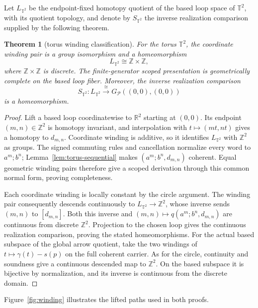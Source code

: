 \documentclass[10pt,reqno]{amsart}
\theoremstyle{definition}
\theoremstyle{plain}
\newtheorem{theorem}[definition]{Theorem}
\theoremstyle{remark}
\newcommand{\Z}{\mathbb Z}
\newcommand{\FigureAltText}[1]{\par\smallskip{\small\textbf{Alt text:} #1\par}}
\newcommand{\MainFigure}[2]{%
  \begingroup\let\SavedFigureCaption\caption
  \renewcommand{\caption}[1]{\SavedFigureCaption{##1}\FigureAltText{#2}}%
  \endgroup}
\begin{document}
Let $L_{\mathbb T^2}$ be the endpoint-fixed homotopy quotient of the based
loop space of $\mathbb T^2$, with its quotient topology, and denote by
$S_{\mathbb T^2}$ the inverse realization comparison supplied by the
following theorem.

\begin{theorem}[torus winding classification]
\label{thm:torus-winding}
For the torus $\mathbb T^2$, the coordinate winding pair is a group
isomorphism and a homeomorphism
\[
  L_{\mathbb T^2}\cong\Z\times\Z,
\]
where $\Z\times\Z$ is discrete.
The finite-generator scoped presentation is geometrically complete on the
based loop fiber.  Moreover, the inverse realization comparison
\[
  S_{\mathbb T^2}:L_{\mathbb T^2}\xrightarrow{\ \cong\ }
  G_{\mathcal P}((0,0),(0,0))
\]
is a homeomorphism.
\end{theorem}

\begin{proof}
Lift a based loop coordinatewise to $\mathbb R^2$ starting at $(0,0)$.
Its endpoint $(m,n)\in\Z^2$ is homotopy invariant, and interpolation
with $t\mapsto(mt,nt)$ gives a homotopy to $d_{m,n}$.
Coordinate winding is additive, so it identifies $L_{\mathbb T^2}$
with $\Z^2$ as groups. The signed commuting rules and cancellation
normalize every word to $a^m;b^n$; Lemma~\ref{lem:torus-sequential}
makes $(a^m;b^n,d_{m,n})$ coherent. Equal geometric winding pairs
therefore give a scoped derivation through this common normal form,
proving completeness.

Each coordinate winding is locally constant by the circle argument.
The winding pair consequently descends continuously to
$L_{\mathbb T^2}\to\Z^2$, whose inverse sends $(m,n)$ to $[d_{m,n}]$.
Both this inverse and $(m,n)\mapsto q(a^m;b^n,d_{m,n})$ are continuous
from discrete $\Z^2$. Projection to the chosen loop gives the continuous
realization comparison, proving the stated homeomorphisms.
For the actual based subspace of the global arrow quotient, take the
two windings of $t\mapsto\gamma(t)-s(p)$ on the full coherent carrier.
As for the circle, continuity and soundness give a continuous descended
map to $\Z^2$. On the based subspace it is bijective by normalization,
and its inverse is continuous from the discrete domain.
\end{proof}

Figure~\ref{fig:winding} illustrates the lifted paths used in both proofs.
\MainFigure{winding}{A lifted circle loop ends at an integer; coordinate lifts of a torus loop end at an integer pair, determining their normal forms.}
\end{document}
